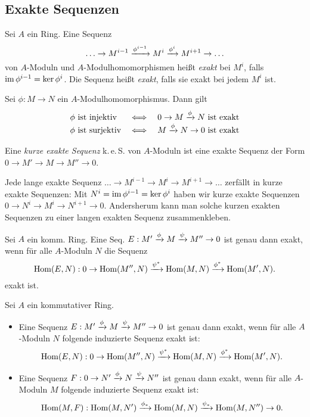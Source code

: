 \documentclass{cheat-sheet}
\DeclareMathOperator{\Hom}{Hom} %
\newcommand{\keS}{k.\,e.\,S.} %
\begin{document}
\subsection{Exakte Sequenzen}


\begin{defn}
  Sei $A$ ein Ring.
  Eine Sequenz
  \[
    \ldots \to M^{i-1} \xrightarrow{\phi^{i-1}} M^i \xrightarrow{\phi^i} M^{i+1} \to \ldots
  \]
  von $A$-Moduln und $A$-Modulhomomorphismen heißt \emph{exakt} bei $M^i$, falls $\operatorname{im} \phi^{i-1} = \ker \phi^i$.
  Die Sequenz heißt \emph{exakt}, falls sie exakt bei jedem $M^i$ ist.
\end{defn}

\begin{bsp}
  Sei $\phi : M \to N$ ein $A$-Modulhomomorphismus.
  Dann gilt
  \[
    \begin{array}{l c l}
      \text{$\phi$ ist injektiv} & \iff & 0 \to M \xrightarrow{\phi} N \text{ ist exakt} \\
      \text{$\phi$ ist surjektiv} & \iff & M \xrightarrow{\phi} N \to 0 \text{ ist exakt}
    \end{array}
  \]
\end{bsp}

\begin{defn}
  Eine \emph{kurze exakte Sequenz} \keS{} von $A$-Moduln ist eine exakte Sequenz der Form $0 \to M' \to M \to M'' \to 0$.
\end{defn}

\begin{bem}
  Jede lange exakte Sequenz $\ldots \to M^{i-1} \to M^i \to M^{i+1} \to \ldots$ zerfällt in kurze exakte Sequenzen: Mit $N^i = \operatorname{im} \phi^{i-1} = \ker \phi^i$ haben wir kurze exakte Sequenzen $0 \to N^i \to M^i \to N^{i+1} \to 0$.
  Andersherum kann man solche kurzen exakten Sequenzen zu einer langen exakten Sequenz zusammenkleben.
\end{bem}

\begin{lem}
  Sei $A$ ein komm. Ring.
  Eine Seq. $E : M' \xrightarrow{\phi} M \xrightarrow{\psi} M'' \to 0$ ist genau dann exakt, wenn für alle $A$-Moduln $N$ die Sequenz
  \[
    \Hom(E, N) : 0 \to \Hom(M'', N) \xra{\psi^*} \Hom(M, N) \xra{\phi^*} \Hom(M', N).
  \]
  exakt ist.
\end{lem}

\begin{lem}
  Sei $A$ ein kommutativer Ring.
  \begin{itemize}
    \item Eine Sequenz $E : M' \xrightarrow{\phi} M \xrightarrow{\psi} M'' \to 0$ ist genau dann exakt, wenn für alle $A$-Moduln $N$ folgende induzierte Sequenz exakt ist:
    \[
      \Hom(E, N) : 0 \to \Hom(M'', N) \xra{\psi^*} \Hom(M, N) \xra{\phi^*} \Hom(M', N).
    \]
    \item Eine Sequenz $F : 0 \to N' \xrightarrow{\phi} N \xrightarrow{\psi} N''$ ist genau dann exakt, wenn für alle $A$-Moduln $M$ folgende induzierte Sequenz exakt ist:
    \[
      \Hom(M, F) : \Hom(M, N') \xra{\phi_*} \Hom(M, N) \xra{\psi_*} \Hom(M, N'') \to 0.
    \]
  \end{itemize}
\end{lem}
\end{document}
